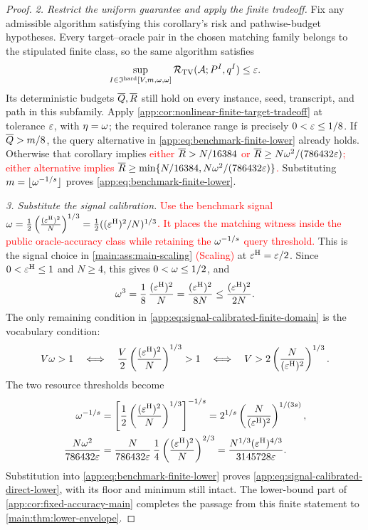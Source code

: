 \begin{proof}
\emph{2. Restrict the uniform guarantee and apply the finite tradeoff.}
Fix any admissible algorithm satisfying this corollary's risk and
pathwise-budget hypotheses. Every target--oracle pair in the chosen
matching family belongs to the stipulated finite class, so the same
algorithm satisfies
\[
 \sup_{I\in\mathfrak I^{\mathrm{hard}}[V,m,\omega,\omega]}
 \mathcal R_{\mathrm{TV}}(\mathcal A;P^{I},q^{I})
 \le\varepsilon.
\]
Its deterministic budgets \(\overline Q,\overline R\) still hold on
every instance, seed, transcript, and path in this subfamily.
Apply \cref{app:cor:nonlinear-finite-target-tradeoff} at tolerance
\(\varepsilon\), with \(\eta=\omega\);
the required tolerance range is precisely
\(0<\varepsilon\le1/8\).
If \(\overline Q>m/8\), the query alternative in
\eqref{app:eq:benchmark-finite-lower} already holds.
Otherwise that corollary implies
\textcolor{red}{either $\overline R>N/16384$ or
$\overline R\ge N\omega^2/(786432\varepsilon)$; either
alternative implies $\overline R\ge
\min\{N/16384,N\omega^2/(786432\varepsilon)\}$.}
Substituting
\(m=\lfloor\omega^{-1/s}\rfloor\)
proves \eqref{app:eq:benchmark-finite-lower}.

\emph{3. Substitute the signal calibration.}
\textcolor{red}{Use the benchmark signal
$\omega=\frac12 \left(\frac{(\varepsilon^{\mathrm H})^2}{N}\right)^{1/3}
=\tfrac12((\varepsilon^{\mathrm H})^2/N)^{1/3}$.  It places the matching witness
inside the public oracle-accuracy class while retaining the
$\omega^{-1/s}$ query threshold.}
This is the signal choice in \textcolor{red}{\cref{main:ass:main-scaling}
(Scaling)} at
\(\varepsilon^{\mathrm H}=\varepsilon/2\).
Since \(0<\varepsilon^{\mathrm H}\le1\) and \(N\ge4\), this gives
\(0<\omega\le1/2\), and
\[
 \omega^3
 =\frac18\,\frac{(\varepsilon^{\mathrm H})^2}{N}
 =\frac{(\varepsilon^{\mathrm H})^2}{8N}
 \le\frac{(\varepsilon^{\mathrm H})^2}{2N}.
\]
The only remaining condition in
\eqref{app:eq:signal-calibrated-finite-domain} is the vocabulary condition:
\[
 V\omega>1
 \quad\Longleftrightarrow\quad
 \frac{V}{2}
      \left(\frac{(\varepsilon^{\mathrm H})^2}{N}\right)^{1/3}>1
 \quad\Longleftrightarrow\quad
 V>2\left(\frac N{(\varepsilon^{\mathrm H})^2}\right)^{1/3}.
\]
The two resource thresholds become
\begin{align*}
 \omega^{-1/s}
 &=\left[\frac12
        \left(\frac{(\varepsilon^{\mathrm H})^2}{N}\right)^{1/3}
   \right]^{-1/s}
 =2^{1/s}
       \left(\frac N{(\varepsilon^{\mathrm H})^2}\right)^{1/(3s)},\\
 \frac{N\omega^2}{786432\varepsilon}
 &=\frac{N}{786432\varepsilon}\,
       \frac14\left(\frac{(\varepsilon^{\mathrm H})^2}{N}\right)^{2/3}
 =\frac{N^{1/3}(\varepsilon^{\mathrm H})^{4/3}}{3145728\varepsilon}.
\end{align*}
Substitution into \eqref{app:eq:benchmark-finite-lower} proves
\eqref{app:eq:signal-calibrated-direct-lower}, with its floor and minimum
still intact. The lower-bound part of
\cref{app:cor:fixed-accuracy-main} completes the passage from this finite
statement to \cref{main:thm:lower-envelope}.
\end{proof}


